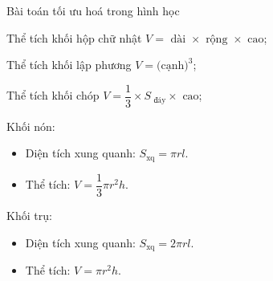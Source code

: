 \begin{dang}{Bài toán tối ưu hoá trong hình học}
	\begin{listEX}[1]
		\item [\ding{172}] Thể tích khối hộp chữ nhật $V= \text{ dài } \times \text{ rộng } \times  \text{ cao}$;
		\item [\ding{173}] Thể tích khối lập phương $V= \text{(cạnh)}^3$;
		\item [\ding{174}] Thể tích khối chóp $V= \dfrac{1}{3} \times S_{\text{ đáy}} \times \text{ cao}$;
		\item [\ding{175}] Khối nón:
		\begin{itemize}
			\item [$\bullet$] Diện tích xung quanh: $S_{\text{xq}}=\pi r l$.
			\item [$\bullet$] Thể tích: $V= \dfrac{1}{3} \pi r^2h$.
		\end{itemize}
		\item [\ding{176}] Khối trụ:
		\begin{itemize}
			\item [$\bullet$] Diện tích xung quanh: $S_{\text{xq}}=2\pi r l$.
			\item [$\bullet$] Thể tích: $V= \pi r^2h$.
		\end{itemize}
	\end{listEX}
\end{dang}

